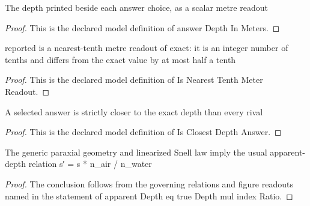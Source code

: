 \begin{definition}
  \label{def:physics:phyx-mini-0042:phyxminiproblems-problemphyxmini0042-answerdepthinmeters}
  The depth printed beside each answer choice, as a scalar metre readout
\end{definition}
\begin{proof}
  This is the declared model definition of answer Depth In Meters.
\end{proof}
\begin{definition}
  \label{def:physics:phyx-mini-0042:phyxminiproblems-problemphyxmini0042-isnearesttenthmeterreadout}
  reported is a nearest-tenth metre readout of exact: it is an integer number of tenths and differs from the exact value by at most half a tenth
\end{definition}
\begin{proof}
  This is the declared model definition of Is Nearest Tenth Meter Readout.
\end{proof}
\begin{definition}
  \label{def:physics:phyx-mini-0042:phyxminiproblems-problemphyxmini0042-isclosestdepthanswer}
  A selected answer is strictly closer to the exact depth than every rival
\end{definition}
\begin{proof}
  This is the declared model definition of Is Closest Depth Answer.
\end{proof}
\begin{lemma}
  \label{lem:physics:phyx-mini-0042:phyxminiproblems-problemphyxmini0042-apparentdepth-eq-truedepth-mul-indexratio}
  The generic paraxial geometry and linearized Snell law imply the usual apparent-depth relation s′ = s * n\_air / n\_water
\end{lemma}
\begin{proof}
  The conclusion follows from the governing relations and figure readouts named in the statement of apparent Depth eq true Depth mul index Ratio.
\end{proof}
